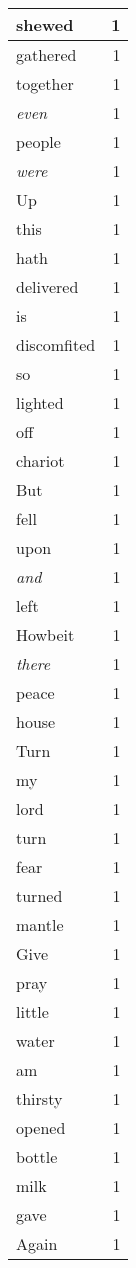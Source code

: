 \begin{center}
\begin{longtable}{l|r}
shewed & 1\\ \hline 
gathered & 1\\ \hline 
together & 1\\ \hline 
\emph{even} & 1\\ \hline 
people & 1\\ \hline 
\emph{were} & 1\\ \hline 
Up & 1\\ \hline 
this & 1\\ \hline 
hath & 1\\ \hline 
delivered & 1\\ \hline 
is & 1\\ \hline 
discomfited & 1\\ \hline 
so & 1\\ \hline 
lighted & 1\\ \hline 
off & 1\\ \hline 
chariot & 1\\ \hline 
But & 1\\ \hline 
fell & 1\\ \hline 
upon & 1\\ \hline 
\emph{and} & 1\\ \hline 
left & 1\\ \hline 
Howbeit & 1\\ \hline 
\emph{there} & 1\\ \hline 
peace & 1\\ \hline 
house & 1\\ \hline 
Turn & 1\\ \hline 
my & 1\\ \hline 
lord & 1\\ \hline 
turn & 1\\ \hline 
fear & 1\\ \hline 
turned & 1\\ \hline 
mantle & 1\\ \hline 
Give & 1\\ \hline 
pray & 1\\ \hline 
little & 1\\ \hline 
water & 1\\ \hline 
am & 1\\ \hline 
thirsty & 1\\ \hline 
opened & 1\\ \hline 
bottle & 1\\ \hline 
milk & 1\\ \hline 
gave & 1\\ \hline 
Again & 1\\ \hline 

\end{longtable}
\end{center}
